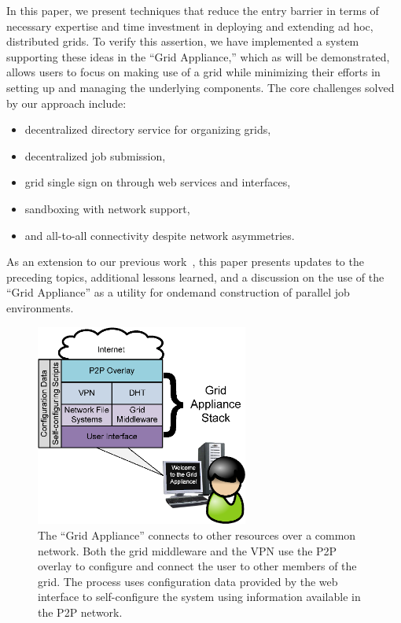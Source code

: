 \documentclass[twocolumn]{svjour3}
\begin{document}
In this paper, we present techniques that reduce the entry barrier in terms of
necessary expertise and time investment in deploying and extending ad hoc,
distributed grids.  To verify this assertion, we have implemented a system
supporting these ideas in the ``Grid Appliance,'' which as will be
demonstrated, allows users to focus on making use of a grid while minimizing
their efforts in setting up and managing the underlying components.  The core
challenges solved by our approach include:

\begin{itemize}
\item decentralized directory service for organizing grids,
\item decentralized job submission,
\item grid single sign on through web services and interfaces,
\item sandboxing with network support,
\item and all-to-all connectivity despite network asymmetries.
\end{itemize}

As an extension to our previous work~\cite{hpdc11}, this paper presents updates
to the preceding topics, additional lessons learned, and a discussion on the
use of the ``Grid Appliance'' as a utility for ondemand construction of
parallel job environments.

\begin{figure}[ht]
\centering
\includegraphics[width=2.75in]{figs/appliance_overlays.eps}
\caption{The ``Grid Appliance'' connects to other resources over a common
network.  Both the grid middleware and the VPN use the P2P overlay to configure
and connect the user to other members of the grid.  The process uses configuration
data provided by the web interface to self-configure the system using information
available in the P2P network.}
\label{fig:appliance}
\end{figure}
\end{document}
